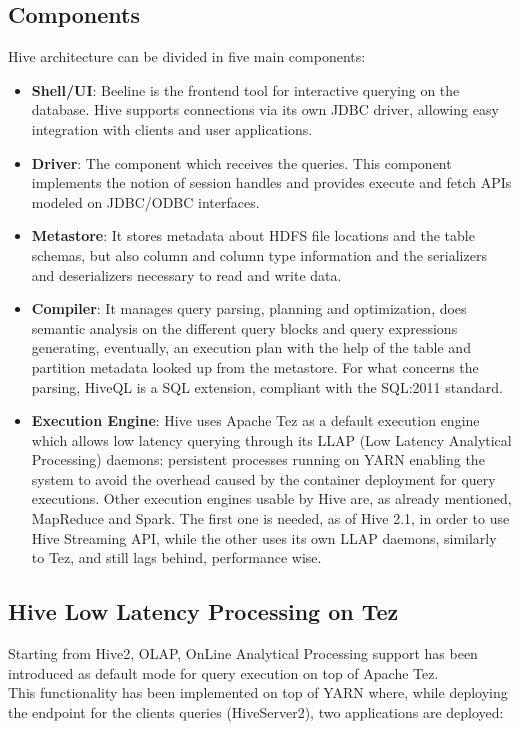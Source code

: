 \subsection{Components}

Hive architecture can be divided in five main components:

\begin{itemize}
    \item \textbf{Shell/UI}: Beeline is the frontend tool for interactive querying on the database. Hive supports connections via its own JDBC driver, allowing easy integration with clients and user applications.
    \item \textbf{Driver}: The component which receives the queries. This component implements the notion of session handles and provides execute and fetch APIs modeled on JDBC/ODBC interfaces.
    \item \textbf{Metastore}: It stores metadata about HDFS file locations and the table schemas, but also column and column type information and the serializers and deserializers necessary to read and write data.
    \item \textbf{Compiler}: It manages query parsing, planning and optimization, does semantic analysis on the different query blocks and query expressions generating, eventually, an execution plan with the help of the table and partition metadata looked up from the metastore. For what concerns the parsing, HiveQL is a SQL extension, compliant with the SQL:2011 standard.
    \item \textbf{Execution Engine}: Hive uses Apache Tez as a default execution engine  which allows low latency querying through its LLAP (Low Latency Analytical Processing) daemons: persistent processes running on YARN enabling the system to avoid the overhead caused by the container deployment for query executions. Other execution engines usable by Hive are, as already mentioned, MapReduce and Spark. The first one is needed, as of Hive 2.1, in order to use Hive Streaming API, while the other uses its own LLAP daemons, similarly to Tez, and still lags behind, performance wise.
\end{itemize}

\subsection{Hive Low Latency Processing on Tez}

Starting from Hive2, OLAP, OnLine Analytical Processing support has been introduced as default mode for query execution on top of Apache Tez.\\  
This functionality has been implemented on top of YARN where, while deploying the endpoint for the clients queries (HiveServer2), two applications are deployed: 

